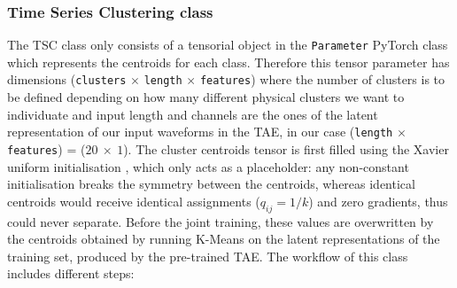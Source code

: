 \subsubsection{Time Series Clustering class}
\label{subsubsec:TSC-class}
The \ac{TSC} class only consists of a tensorial object in the \texttt{Parameter} PyTorch class which represents the centroids for each class. Therefore this tensor parameter has dimensions (\texttt{clusters} $\times$ \texttt{length} $\times$ \texttt{features}) where the number of clusters is to be defined depending on how many different physical clusters we want to individuate and input length and channels are the ones of the latent representation of our input waveforms in the \ac{TAE}, in our case (\texttt{length} $\times$ \texttt{features}) = ($20~\times~1$). The cluster centroids tensor is first filled using the Xavier uniform initialisation \cite{Xavier}, which only acts as a placeholder: any non-constant initialisation breaks the symmetry between the centroids, whereas identical centroids would receive identical assignments ($q_{ij} = 1/k$) and zero gradients, thus could never separate. Before the joint training, these values are overwritten by the centroids obtained by running K-Means on the latent representations of the training set, produced by the pre-trained \ac{TAE}.
 The workflow of this class includes different steps:
